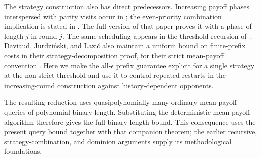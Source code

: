 The strategy construction also has direct predecessors.
Increasing payoff phases interspersed with parity visits occur in
\cite{ChatterjeeHenzingerJurdzinski2005}; the even-priority combination
implication is stated in
\cite[Lemma~5]{BouyerMarkeyOlschewskiUmmels2011}.
The full version of that paper proves it with a phase of length $j$
in round $j$. The same scheduling appears in the threshold recursion
of~\cite[Appendix~C, full version]{ChatterjeeHenzingerSvozil2017}.
Daviaud, Jurdzi\'nski, and Lazi\'c also maintain a uniform bound on
finite-prefix costs in their strategy-decomposition proof, for their
strict mean-payoff convention
\cite[Sections~2.3--2.4]{DaviaudJurdzinskiLazic2018}.
Here we make the all-$\epsilon$ prefix guarantee explicit for a
single strategy at the non-strict threshold and use it to control
repeated restarts in the increasing-round construction against
history-dependent opponents.

The resulting reduction uses quasipolynomially many ordinary
mean-payoff queries of polynomial binary length. Substituting the
deterministic mean-payoff algorithm
\cite[Theorem~1.1 and Corollary~7.1]{OpenAI2026Deterministic}
therefore gives the full binary-length bound. This consequence uses
the present query bound together with that companion theorem; the
earlier recursive, strategy-combination, and dominion arguments supply
its methodological foundations.
